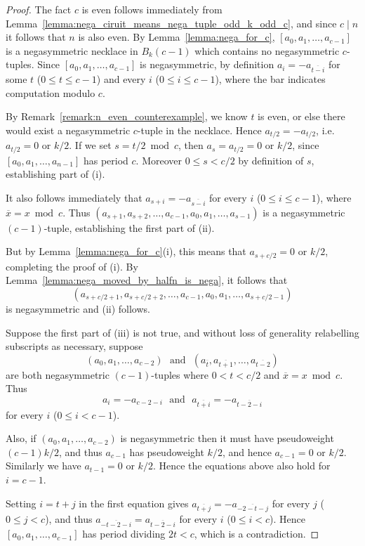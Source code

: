 \documentclass[a4paper,11pt]{article}
\theoremstyle{plain}
\theoremstyle{definition}
\theoremstyle{remark}
\begin{document}
\begin{proof}
The fact $c$ is even follows immediately from
    Lemma~\ref{lemma:nega_ciruit_means_nega_tuple_odd_k_odd_c}, and since $c\mid n$ it follows that
    $n$ is also even. By Lemma~\ref{lemma:nega_for_c}, $[a_0,a_1,\dots,a_{c-1}]$ is a
    negasymmetric necklace in $B_k(c-1)$ which contains no negasymmetric $c$-tuples. Since
    $[a_0,a_1,\dots,a_{c-1}]$ is negasymmetric, by definition $a_{i}=-a_{\overline{t-i}}$ for
    some $t$ ($0\leq t\leq c-1$) and every $i$ ($0\leq i\leq c-1$), where the bar indicates
    computation modulo $c$.

By Remark~\ref{remark:n_even_counterexample}, we know $t$ is even, or else there would exist a
    negasymmetric $c$-tuple in the necklace. Hence $a_{t/2}=-a_{t/2}$, i.e.\ $a_{t/2}=0$ or $k/2$.  If we
    set $s=t/2\bmod c$, then $a_{s}=a_{t/2}=0$ or $k/2$, since $[a_0,a_1,\dots,a_{n-1}]$ has period $c$.
    Moreover $0\leq s<c/2$ by definition of $s$, establishing part of (i).

It also follows immediately that $a_{s+i}=-a_{\overline{s-i}}$ for every $i$ ($0\leq i\leq
    c-1$), where $\overline{x}=x\bmod c$.  Thus
    $(a_{s+1},a_{s+2},\dots,a_{c-1},a_0,a_1,\dots,a_{s-1})$ is a negasymmetric $(c-1)$-tuple,
    establishing the first part of (ii).

But by Lemma~\ref{lemma:nega_for_c}(i), this means that $a_{s+c/2}=0$ or $k/2$, completing the
proof of (i). By Lemma~\ref{lemma:nega_moved_by_halfn_is_nega}, it follows that
\[ (a_{s+c/2+1},a_{s+c/2+2},\dots,a_{c-1},a_0,a_1,\dots,a_{s+c/2-1}) \]
is negasymmetric and (ii) follows.

Suppose the first part of (iii) is not true, and without loss of generality relabelling subscripts
as necessary, suppose
\[ (a_0,a_1,\dots,a_{c-2}) \text{~~and~~}
(a_{\overline{t}},a_{\overline{t+1}},\dots,a_{\overline{t-2}}) \]
are both negasymmetric
$(c-1)$-tuples where $0<t<c/2$ and $\overline{x}=x\bmod c$.  Thus
\[ a_i=-a_{c-2-i} \text{~~and~~} a_{\overline{t+i}}=-a_{\overline{t-2-i}} \]
for every $i$ ($0\leq i<c-1$).

Also, if $(a_0,a_1,\dots,a_{c-2})$ is negasymmetric then it must have pseudoweight
 $(c-1)k/2$, and thus $a_{c-1}$ has pseudoweight
$k/2$, and hence $a_{c-1}=0$ or $k/2$. Similarly we have $a_{t-1}=0$ or $k/2$. Hence the equations
above also hold for $i=c-1$.

Setting $i=t+j$ in the first equation gives $a_{\overline{t+j}}=-a_{\overline{-2-t-j}}$ for every
$j$ ($0\leq j<c$), and thus $a_{\overline{-t-2-i}}=a_{\overline{t-2-i}}$ for every $i$ ($0\leq
i<c$). Hence $[a_0,a_1,\dots,a_{c-1}]$ has period dividing $2t<c$, which is a contradiction.


\end{proof}
\end{document}
